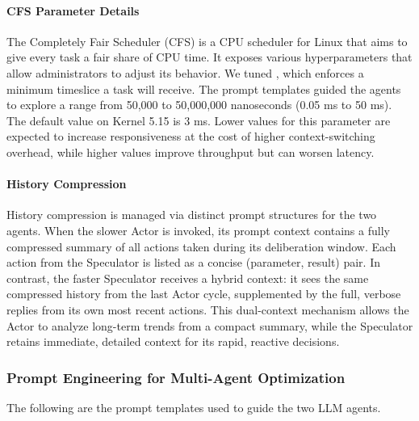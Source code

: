\paragraph{CFS Parameter Details}
The Completely Fair Scheduler (CFS) is a CPU scheduler for Linux that aims to give every task a fair share of CPU time. It exposes various hyperparameters that allow administrators to adjust its behavior. We tuned , which enforces a minimum timeslice a task will receive. The prompt templates guided the agents to explore a range from 50,000 to 50,000,000 nanoseconds (0.05 ms to 50 ms). The default value on Kernel 5.15 is 3 ms. Lower values for this parameter are expected to increase responsiveness at the cost of higher context-switching overhead, while higher values improve throughput but can worsen latency.

\paragraph{History Compression}
\label{app:history_os}
History compression is managed via distinct prompt structures for the two agents. When the slower Actor is invoked, its prompt context contains a fully compressed summary of all actions taken during its deliberation window. Each action from the Speculator is listed as a concise (parameter, result) pair. In contrast, the faster Speculator receives a hybrid context: it sees the same compressed history from the last Actor cycle, supplemented by the full, verbose replies from its own most recent actions. This dual-context mechanism allows the Actor to analyze long-term trends from a compact summary, while the Speculator retains immediate, detailed context for its rapid, reactive decisions.


\subsubsection{Prompt Engineering for Multi-Agent Optimization}
\label{app:prompt_os}
The following are the prompt templates used to guide the two LLM agents.

